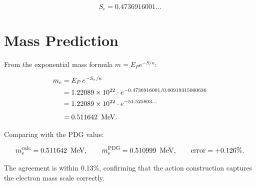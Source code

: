 \[
\boxed{S_e = 0.4736916001\ldots}
\]

\section{Mass Prediction}

From the exponential mass formula \(m = E_P e^{-S/\kappa}\):

\[
\begin{aligned}
m_e &= E_P \, e^{-S_e/\kappa} \\
    &= 1.22089 \times 10^{22} \cdot
       e^{-0.4736916001 / 0.00919315000636} \\
    &= 1.22089 \times 10^{22} \cdot
       e^{-51.525803\ldots} \\[4pt]
    &= 0.511642\ \,\text{MeV}.
\end{aligned}
\]

Comparing with the PDG value:

\[
m_e^{\text{calc}} = 0.511642\ \,\text{MeV},\qquad
m_e^{\text{PDG}} = 0.510999\ \,\text{MeV},\qquad
\text{error} = +0.126\%.
\]

The agreement is within 0.13\%, confirming that the action construction
captures the electron mass scale correctly.
